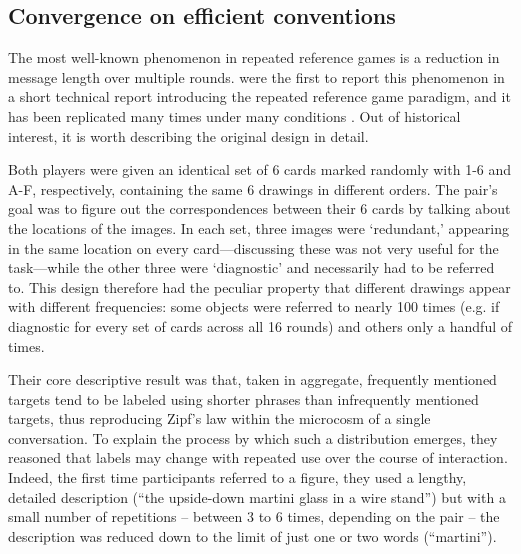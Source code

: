 \documentclass[11pt, floatsintext, jou]{apa6}
\begin{document}
\subsection{Convergence on efficient conventions}

The most well-known phenomenon in repeated reference games is a reduction in message length over multiple rounds.  were the first to report this phenomenon in a short technical report introducing the repeated reference game paradigm, and it has been replicated many times under many conditions \cite<most notably by>[in a much more streamlined experimental design using tangram shapes]{ClarkWilkesGibbs86_ReferringCollaborative}. Out of historical interest, it is worth describing the original design in detail. 

Both players were given an identical set of 6 cards marked randomly with 1-6 and A-F, respectively, containing the same 6 drawings in different orders. The pair's goal was to figure out the correspondences between their 6 cards by talking about the locations of the images. In each set, three images were `redundant,' appearing in the same location on every card---discussing these was not very useful for the task---while the other three were `diagnostic' and necessarily had to be referred to. This design therefore had the peculiar property that different drawings appear with different frequencies: some objects were referred to nearly 100 times (e.g. if diagnostic for every set of cards across all 16 rounds) and others only a handful of times. 

Their core descriptive result was that, taken in aggregate, frequently mentioned targets tend to be labeled using shorter phrases than infrequently mentioned targets, thus reproducing Zipf's law within the microcosm of a single conversation. To explain the process by which such a distribution emerges, they reasoned that labels may change with repeated use over the course of interaction. Indeed, the first time participants referred to a figure, they used a lengthy, detailed description (``the upside-down martini glass in a wire stand'') but with a small number of repetitions -- between 3 to 6 times, depending on the pair -- the description was reduced down to the limit of just one or two words (``martini''). 

\end{document}
